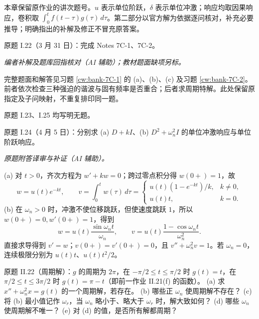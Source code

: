 本章保留原作业的讲次题号。$u$ 表示单位阶跃，$\delta$ 表示单位冲激；响应均取因果响应，卷积取 $\int_0^t f(t-\tau)g(\tau)\,d\tau$。第二部分以官方解为依据逐问核对，补充必要推导；明确指出的补解及修正不冒充原答案。
\begin{exercise}\label{cw:ps6-I-22}原题 I.22（3 月 31 日）：完成 Notes 7C-1、7C-2。\end{exercise}
\begin{solution}
\textit{编者补解及题库回指核对（AI 辅助）；教材题面缺项另标。}\par

完整题面和解答见习题 \ref{cw:bank-7C-1} 的 (a)、(b)、(c) 及习题 \ref{cw:bank-7C-2}。前者依次检查三种强迫的谐波与固有频率是否重合；后者求周期特解。此处保留原指定及子问映射，不重复排印同一题。
\end{solution}
原题 I.23、I.25 均写明无题。
\begin{exercise}\label{cw:ps6-I-24}原题 I.24（4 月 5 日）：分别求 (a) $D+kI$、(b) $D^2+\omega_n^2I$ 的单位冲激响应与单位阶跃响应。\end{exercise}
\begin{solution}
\textit{原题附答译审与补证（AI 辅助）。}\par

(a) 对 $t>0$，齐次方程为 $w'+kw=0$；跨过零点积分得 $w(0+)=1$，故
\[w=u(t)e^{-kt},\qquad v=\int_0^tw(\tau)\,d\tau=\begin{cases}u(t)(1-e^{-kt})/k,&k\ne0,\\u(t)t,&k=0.\end{cases}\]
(b) 在 $\omega_n>0$ 时，冲激不使位移跳跃，但使速度跳跃 $1$，所以 $w(0+)=0,w'(0+)=1$，得到
\[w=u(t)\frac{\sin\omega_nt}{\omega_n},\qquad v=u(t)\frac{1-\cos\omega_nt}{\omega_n^2}.\]
直接求导得到 $v'=w$；$v(0+)=v'(0+)=0$，且 $v''+\omega_n^2v=1$。若 $\omega_n=0$，连续极限分别为 $u(t)t$、$u(t)t^2/2$。
\end{solution}
\begin{exercise}\label{cw:ps6-II-22}原题 II.22（周期解）：$g$ 的周期为 $2\pi$，在 $-\pi/2\le t\le\pi/2$ 时 $g(t)=t$，在 $\pi/2\le t\le3\pi/2$ 时 $g(t)=\pi-t$（即前一作业 II.21(f) 的函数）。
(a) 求 $x''+\omega_n^2x=g(t)$ 的一个周期解，若存在。
(b) 哪些正 $\omega_n$ 使周期解不存在？
(c) 将 (b) 最小值记作 $\omega_r$，当 $\omega_n$ 略小于、略大于 $\omega_r$ 时，解大致如何？
(d) 哪些 $\omega_n$ 使周期解不唯一？
(e) 对 (d) 的值，是否所有解都周期？\end{exercise}

